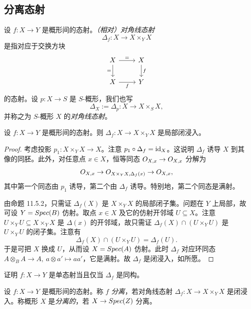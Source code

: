 \subsection{分离态射}\label{sec:18.2}

\begin{definition}\label{def:18.2.1}
设 $f:X\to Y$ 是概形间的态射。\emph{（相对）对角线态射}
\[
\Delta_f:X\longrightarrow X\times_Y X
\]
是指对应于交换方块
\[
\begin{tikzcd}
X \arrow[r,"="] \arrow[d,"="'] & X \arrow[d,"f"] \\
X \arrow[r,"f"'] & Y
\end{tikzcd}
\]
的态射。设 $p:X\to S$ 是 $S$-概形，我们也写
\[
\Delta_X:=\Delta_p:X\longrightarrow X\times_S X,
\]
并称之为 $S$-概形 $X$ 的\emph{对角线态射}。
\end{definition}

\begin{lemma}\label{lem:18.2.2}
设 $f:X\to Y$ 是概形间的态射。则 $\Delta_f:X\to X\times_Y X$ 是局部闭浸入。
\end{lemma}

\begin{proof}
考虑投影 $p_1:X\times_Y X\to X$。注意 $p_1\circ\Delta_f=\operatorname{id}_X$。这说明 $\Delta_f$ 诱导 $X$ 到其像的同胚。此外，对任意点 $x\in X$，恒等同态 $O_{X,x}\to O_{X,x}$ 分解为
\[
O_{X,x}\to O_{X\times_Y X,\Delta_f(x)}\to O_{X,x},
\]
其中第一个同态由 $p_1$ 诱导，第二个由 $\Delta_f$ 诱导。特别地，第二个同态是满射。

由命题 11.5.2，只需证 $\Delta_f(X)$ 是 $X\times_Y X$ 的局部闭子集。问题在 $Y$ 上局部，故可设 $Y=Spec(B)$ 仿射。取点 $x\in X$ 及它的仿射开邻域 $U\subseteq X$。注意 $U\times_Y U\subseteq X\times_Y X$ 是 $\Delta(x)$ 的开邻域，故只需证 $\Delta_f(X)\cap(U\times_Y U)$ 是 $U\times_Y U$ 的闭子集。注意有
\[
\Delta_f(X)\cap(U\times_Y U)=\Delta_f(U).
\]
于是可把 $X$ 换成 $U$，从而设 $X=Spec(A)$ 仿射。此时 $\Delta_f$ 对应环同态 $A\otimes_B A\to A,\ a\otimes a'\mapsto aa'$，它是满射。故 $\Delta_f$ 是闭浸入，如所愿。
\end{proof}

\begin{exercise}\label{exc:18.2.3}
证明 $f:X\to Y$ 是单态射当且仅当 $\Delta_f$ 是同构。
\end{exercise}

\begin{definition}\label{def:18.2.4}
设 $f:X\to Y$ 是概形间的态射。称 $f$ \emph{分离}，若对角线态射 $\Delta_f:X\to X\times_Y X$ 是闭浸入。称概形 $X$ 是\emph{分离的}，若 $X\to Spec(Z)$ 分离。
\end{definition}

